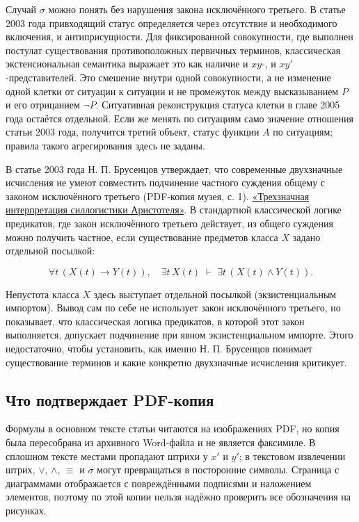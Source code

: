 \documentclass[12pt,a4paper]{article}
\begin{document}
Случай \(\sigma\) можно понять без нарушения закона исключённого третьего. В статье 2003 года привходящий статус определяется через отсутствие и необходимого включения, и антиприсущности. Для фиксированной совокупности, где выполнен постулат существования противоположных первичных терминов, классическая экстенсиональная семантика выражает это как наличие и \(xy\)-, и \(xy'\)-представителей. Это смешение внутри одной совокупности, а не изменение одной клетки от ситуации к ситуации и не промежуток между высказыванием \(P\) и его отрицанием \(\neg P\). Ситуативная реконструкция статуса клетки в главе 2005 года остаётся отдельной. Если же менять по ситуациям само значение отношения статьи 2003 года, получится третий объект, статус функции \(A\) по ситуациям; правила такого агрегирования здесь не заданы.

В статье 2003 года Н. П. Брусенцов утверждает, что современные двухзначные исчисления не умеют совместить подчинение частного суждения общему с законом исключённого третьего (PDF-копия музея, с. 1). \href{https://computer-museum.ru/histussr/trilog0.htm}{«Трехзначная интерпретация силлогистики Аристотеля»}. В стандартной классической логике предикатов, где закон исключённого третьего действует, из общего суждения можно получить частное, если существование предметов класса \(X\) задано отдельной посылкой:

\[
\forall t\,(X(t)\to Y(t)),\quad \exists t\,X(t)
\;\vdash\; \exists t\,(X(t)\land Y(t)).
\]

Непустота класса \(X\) здесь выступает отдельной посылкой (экзистенциальным импортом). Вывод сам по себе не использует закон исключённого третьего, но показывает, что классическая логика предикатов, в которой этот закон выполняется, допускает подчинение при явном экзистенциальном импорте. Этого недостаточно, чтобы установить, как именно Н. П. Брусенцов понимает существование терминов и какие конкретно двухзначные исчисления критикует.

\subsection{Что подтверждает PDF-копия}

Формулы в основном тексте статьи читаются на изображениях PDF, но копия была пересобрана из архивного Word-файла и не является факсимиле. В сплошном тексте местами пропадают штрихи у \(x'\) и \(y'\); в текстовом извлечении штрих, \(\lor\), \(\land\), \(\equiv\) и \(\sigma\) могут превращаться в посторонние символы. Страница с диаграммами отображается с повреждёнными подписями и наложением элементов, поэтому по этой копии нельзя надёжно проверить все обозначения на рисунках.
\end{document}
